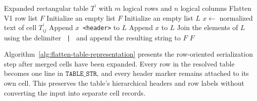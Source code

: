 \begin{algorithm}[!t]
\caption{Flatten V1 Serialization after Merged-Cell Expansion}\label{alg:flatten-table-representation}
\begin{algorithmic}[1]
\Require Expanded rectangular table $T^{\prime}$ with $m$ logical rows and $n$ logical columns
\Ensure Flatten V1 row list $F$
\State Initialize an empty list $F$
    \State Initialize an empty list $L$
        \State $x \gets$ normalized text of cell $T^{\prime}_{ij}$
            \State Append $x$\texttt{ <header>} to $L$
        \Else
            \State Append $x$ to $L$
        \EndIf
    \EndFor
    \State Join the elements of $L$ using the delimiter \texttt{ | } and append the resulting string to $F$
\EndFor
\State \Return $F$
\end{algorithmic}
\end{algorithm}

Algorithm~\ref{alg:flatten-table-representation} presents the row-oriented serialization step after merged cells have been expanded. Every row in the resolved table becomes one line in $\texttt{TABLE\_STR}$, and every header marker remains attached to its own cell. This preserves the table's hierarchical headers and row labels without converting the input into separate cell records.






